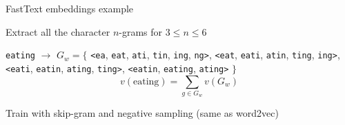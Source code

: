 \documentclass[12pt,aspectratio=169,handout]{beamer}
\begin{document}
\begin{frame}{FastText embeddings example}
	
Extract all the character $n$-grams for $3 \leq n \leq 6$

\begin{example}
\texttt{eating} $\to$ $G_w = \{$
\texttt{<ea}, \texttt{eat}, \texttt{ati}, \texttt{tin}, \texttt{ing}, \texttt{ng>},
\texttt{<eat}, \texttt{eati}, \texttt{atin}, \texttt{ting}, \texttt{ing>},
\texttt{<eati}, \texttt{eatin}, \texttt{ating}, \texttt{ting>},
\texttt{<eatin}, \texttt{eating}, \texttt{ating>} $\}$
$$
v(\text{eating}) = \sum_{g \in G_w} v(G_w)
$$
\end{example}

Train with skip-gram and negative sampling (same as word2vec)




	
\end{frame}
\end{document}
